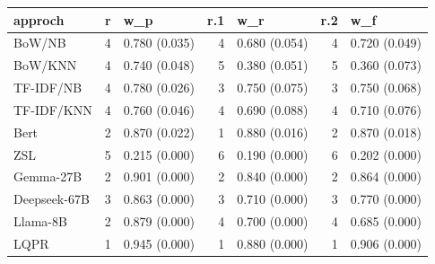 \begin{tabular}{lrlrlrl}
\hline
 approch      &   r & w\_p           &   r.1 & w\_r           &   r.2 & w\_f           \\
\hline
 BoW/NB       &   4 & 0.780 (0.035) &     4 & 0.680 (0.054) &     4 & 0.720 (0.049) \\
 BoW/KNN      &   4 & 0.740 (0.048) &     5 & 0.380 (0.051) &     5 & 0.360 (0.073) \\
 TF-IDF/NB    &   4 & 0.780 (0.026) &     3 & 0.750 (0.075) &     3 & 0.750 (0.068) \\
 TF-IDF/KNN   &   4 & 0.760 (0.046) &     4 & 0.690 (0.088) &     4 & 0.710 (0.076) \\
 Bert         &   2 & 0.870 (0.022) &     1 & 0.880 (0.016) &     2 & 0.870 (0.018) \\
 ZSL          &   5 & 0.215 (0.000) &     6 & 0.190 (0.000) &     6 & 0.202 (0.000) \\
 Gemma-27B    &   2 & 0.901 (0.000) &     2 & 0.840 (0.000) &     2 & 0.864 (0.000) \\
 Deepseek-67B &   3 & 0.863 (0.000) &     3 & 0.710 (0.000) &     3 & 0.770 (0.000) \\
 Llama-8B     &   2 & 0.879 (0.000) &     4 & 0.700 (0.000) &     4 & 0.685 (0.000) \\
 LQPR         &   1 & 0.945 (0.000) &     1 & 0.880 (0.000) &     1 & 0.906 (0.000) \\
\hline
\end{tabular}